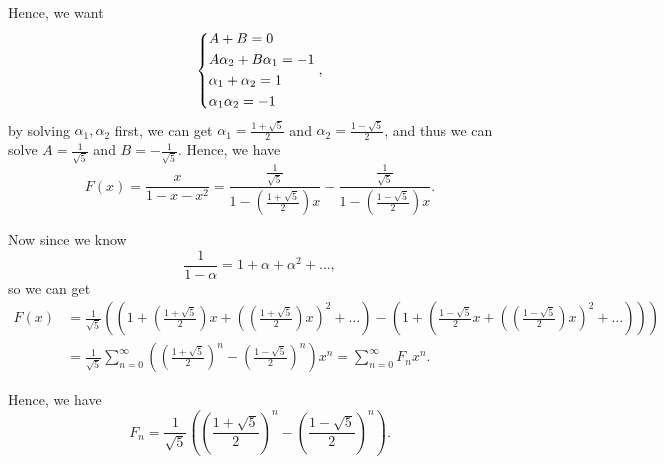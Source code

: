 Hence, we want 
\[
    \begin{dcases}
        A + B = 0 \\
        A \alpha _2 + B \alpha _1 = -1 \\
        \alpha _1 + \alpha _2 = 1 \\
        \alpha _1 \alpha _2 = -1 \\
    \end{dcases},
\]
 by solving \(\alpha _1, \alpha _2\) first, we can get \(\alpha _1 = \frac{1 + \sqrt{5} }{2}\) and \(\alpha _2 = \frac{1 - \sqrt{5} }{2}\), and thus we can solve \(A = \frac{1}{\sqrt{5} }\) and \(B = -\frac{1}{\sqrt{5} }\). Hence, we have 
 \[
    F(x) = \frac{x}{1 - x - x^2} = \frac{\frac{1}{\sqrt{5} }}{1 - \left( \frac{1 + \sqrt{5} }{2} \right)x } - \frac{\frac{1}{\sqrt{5} }}{1 - \left( \frac{1 - \sqrt{5} }{2} \right)x }. 
 \]

 Now since we know 
 \[
    \frac{1}{1- \alpha } = 1 + \alpha + \alpha ^2 + \dots ,
 \]so we can get 
\begin{align*}
    F(x) &= \frac{1}{\sqrt{5} } \left( \left( 1 + \left( \frac{1+\sqrt{5} }{2} \right)x + \left( \left( \frac{1+\sqrt{5} }{2} \right)x \right)^2  + \dots   \right) - \left( 1 + \left( \frac{1 - \sqrt{5} }{2}x + \left( \left( \frac{1-\sqrt{5} }{2} \right)x \right)^2+ \dots  \right)  \right)   \right) \\ &= \frac{1}{\sqrt{5} } \sum_{n=0}^{\infty} \left( \left( \frac{1 + \sqrt{5} }{2} \right)^n - \left( \frac{1 - \sqrt{5} }{2} \right)^n  \right) x^n = \sum_{n=0}^{\infty} F_n x^n.   
\end{align*}

Hence, we have 
\[
    F_n = \frac{1}{\sqrt{5} } \left( \left( \frac{1 + \sqrt{5} }{2} \right)^n - \left( \frac{1 - \sqrt{5} }{2} \right)^n   \right). 
\]